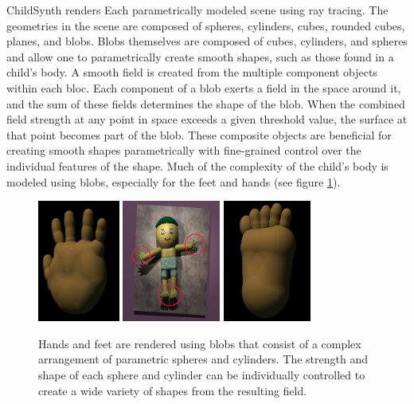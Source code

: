 \documentclass{article}
\begin{document}
ChildSynth renders Each parametrically modeled scene using ray tracing. The geometries in the scene are composed of spheres, cylinders, cubes, rounded cubes, planes, and blobs. Blobs themselves are composed of cubes, cylinders, and spheres and allow one to parametrically create smooth shapes, such as those found in a child's body. A smooth field is created from the multiple component objects within each bloc. Each component of a blob exerts a field in the space around it, and the sum of these fields determines the shape of the blob. When the combined field strength at any point in space exceeds a given threshold value, the surface at that point becomes part of the blob. These composite objects are beneficial for creating smooth shapes parametrically with fine-grained control over the individual features of the shape. Much of the complexity of the child's body is modeled using blobs, especially for the feet and hands (see figure \ref{fig:hand_foot}). 

\begin{figure}[htbp]
    \centering
    \includegraphics[height=4cm]{plots/hand.png}
    \includegraphics[height=4cm]{plots/back.png}
    \includegraphics[height=4cm]{plots/foot.png}
    \caption{Hands and feet are rendered using blobs that consist of a complex arrangement of parametric spheres and cylinders. The strength and shape of each sphere and cylinder can be individually controlled to create a wide variety of shapes from the resulting field.}
    \label{fig:hand_foot}
\end{figure}
\end{document}

